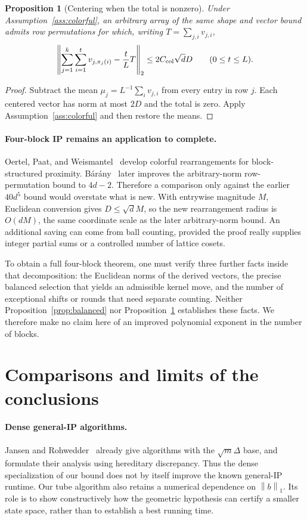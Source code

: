 \documentclass[11pt]{article}
\newtheorem{proposition}[theorem]{Proposition}
\theoremstyle{definition}
\theoremstyle{remark}
\newcommand{\norm}[1]{\left\lVert #1\right\rVert}
\begin{document}
\begin{proposition}[Centering when the total is nonzero]\label{prop:center}
Under Assumption~\ref{ass:colorful}, an arbitrary array of the same
shape and vector bound admits row permutations for which, writing
$T=\sum_{j,i}v_{j,i}$,
\[
 \norm{\sum_{j=1}^k\sum_{i=1}^t v_{j,\pi_j(i)}-\frac tL T}_2
 \le 2C_{\rm col}\sqrt d D\qquad(0\le t\le L).
\]
\end{proposition}
\begin{proof}
Subtract the mean $\mu_j=L^{-1}\sum_i v_{j,i}$ from every entry in
row $j$. Each centered vector has norm at most $2D$ and the total is
zero. Apply Assumption~\ref{ass:colorful} and then restore the means.
\end{proof}

\paragraph{Four-block IP remains an application to complete.}
Oertel, Paat, and Weismantel~\cite{OPW} develop colorful rearrangements
for block-structured proximity. B\'ar\'any~\cite{Barany} later improves
the arbitrary-norm row-permutation bound to $4d-2$.
Therefore a comparison only against the earlier $40d^5$ bound would
overstate what is new. With entrywise magnitude $M$, Euclidean conversion
gives $D\le\sqrt d M$, so the new rearrangement radius is $O(dM)$,
the same coordinate scale as the later arbitrary-norm bound. An additional
saving can come from ball counting, provided the proof really supplies
integer partial sums or a controlled number of lattice cosets.

To obtain a full four-block theorem, one must verify three further facts
inside that decomposition: the Euclidean norms of the derived vectors,
the precise balanced selection that yields an admissible kernel move,
and the number of exceptional shifts or rounds that need separate counting.
Neither Proposition~\ref{prop:balanced} nor
Proposition~\ref{prop:center} establishes these facts. We therefore make
no claim here of an improved polynomial exponent in the number of blocks.

\section{Comparisons and limits of the conclusions}\label{sec:comparison}

\paragraph{Dense general-IP algorithms.}
Jansen and Rohwedder~\cite{JR} already give algorithms with the
$\sqrt m\Delta$ base, and formulate their analysis using hereditary
discrepancy. Thus the dense specialization of our bound does not by
itself improve the known general-IP runtime. Our tube algorithm also
retains a numerical dependence on $\norm b_1$. Its role is to show
constructively how the geometric hypothesis can certify a smaller state
space, rather than to establish a best running time.
\end{document}
